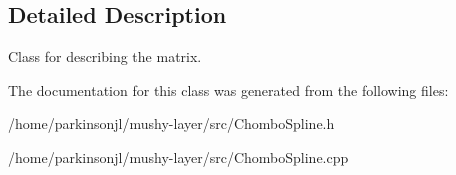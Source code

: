 \subsection{Detailed Description}
Class for describing the matrix. 

The documentation for this class was generated from the following files\+:\begin{DoxyCompactItemize}
\item 
/home/parkinsonjl/mushy-\/layer/src/Chombo\+Spline.\+h\item 
/home/parkinsonjl/mushy-\/layer/src/Chombo\+Spline.\+cpp\end{DoxyCompactItemize}
